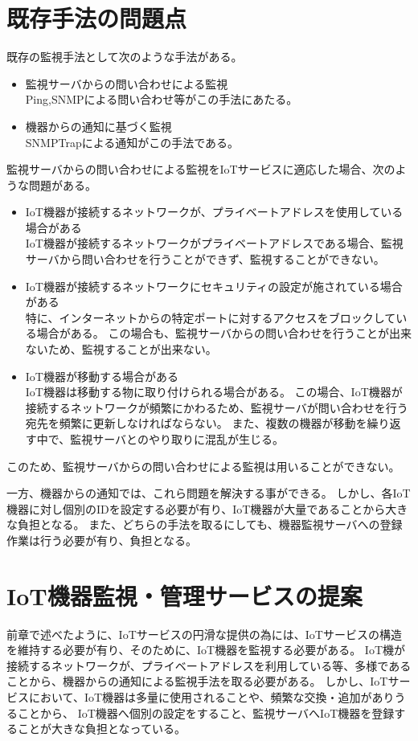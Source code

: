 \section{既存手法の問題点}
既存の監視手法として次のような手法がある。
\begin{itemize}
\item 監視サーバからの問い合わせによる監視\\
	Ping,SNMPによる問い合わせ等がこの手法にあたる。
\item 機器からの通知に基づく監視\\
	SNMPTrapによる通知がこの手法である。
\end{itemize}

監視サーバからの問い合わせによる監視をIoTサービスに適応した場合、次のような問題がある。
\begin{itemize}
\item IoT機器が接続するネットワークが、プライベートアドレスを使用している場合がある\\
	IoT機器が接続するネットワークがプライベートアドレスである場合、監視サーバから問い合わせを行うことができず、監視することができない。
\item IoT機器が接続するネットワークにセキュリティの設定が施されている場合がある\\
	特に、インターネットからの特定ポートに対するアクセスをブロックしている場合がある。
	この場合も、監視サーバからの問い合わせを行うことが出来ないため、監視することが出来ない。
\item IoT機器が移動する場合がある\\
	IoT機器は移動する物に取り付けられる場合がある。
	この場合、IoT機器が接続するネットワークが頻繁にかわるため、監視サーバが問い合わせを行う宛先を頻繁に更新しなければならない。
	また、複数の機器が移動を繰り返す中で、監視サーバとのやり取りに混乱が生じる。
\end{itemize}
このため、監視サーバからの問い合わせによる監視は用いることができない。

一方、機器からの通知では、これら問題を解決する事ができる。
しかし、各IoT機器に対し個別のIDを設定する必要が有り、IoT機器が大量であることから大きな負担となる。
また、どちらの手法を取るにしても、機器監視サーバへの登録作業は行う必要が有り、負担となる。

\section{IoT機器監視・管理サービスの提案}
前章で述べたように、IoTサービスの円滑な提供の為には、IoTサービスの構造を維持する必要が有り、そのために、IoT機器を監視する必要がある。
IoT機が接続するネットワークが、プライベートアドレスを利用している等、多様であることから、機器からの通知による監視手法を取る必要がある。
しかし、IoTサービスにおいて、IoT機器は多量に使用されることや、頻繁な交換・追加がありうることから、
IoT機器へ個別の設定をすること、監視サーバへIoT機器を登録することが大きな負担となっている。

